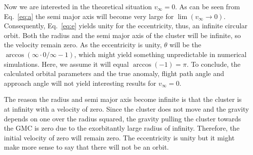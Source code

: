 \documentclass{aa}
\begin{document}
Now we are interested in the theoretical situation $v_\infty = 0$. As can be seen from Eq.~\eqref{eq:a} the semi major axis will become very large for $\lim (v_\infty \rightarrow 0)$. Consequently, Eq.~\eqref{eq:e} yields unity for the eccentricity, thus, an infinite circular orbit. Both the radius and the semi major axis of the cluster will be infinite, so the velocity remain zero. As the eccentricity is unity, $\theta$ will be the $\arccos(\infty\cdot0/\infty - 1)$, which might yield something unpredictable in numerical simulations. Here, we assume it will equal $\arccos(-1) = \pi$. To conclude, the calculated orbital parameters and the true anomaly, flight path angle and approach angle will not yield interesting results for $v_\infty = 0$.

The reason the radius and semi major axis become infinite is that the cluster is at infinity with a velocity of zero. Since the cluster does not move and the gravity depends on one over the radius squared, the gravity pulling the cluster towards the GMC is zero due to the exorbitantly large radius of infinity. Therefore, the initial velocity of zero will remain zero. The eccentricity is unity but it might make more sense to say that there will not be an orbit. \\
% 
% 
% 
% 



\end{document}
